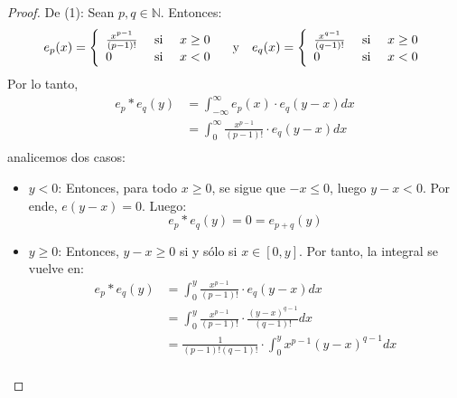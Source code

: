 \documentclass[12pt]{report}
\theoremstyle{largebreak}
\begin{document}
    \begin{proof}
        De (1): Sean $p,q\in\mathbb{N}$. Entonces:
        \begin{equation*}
            e_p(x)=\left\{
                    \begin{array}{lcr}
                        \frac{x^{p-1}}{(p-1)!} & \textup{ si } & x\geq 0 \\
                        0 & \textup{ si }&x<0\\
                    \end{array}
                \right.
            \quad\textup{y}\quad
            e_q(x)=\left\{
                    \begin{array}{lcr}
                        \frac{x^{q-1}}{(q-1)!} & \textup{ si } & x\geq 0 \\
                        0 & \textup{ si }&x<0\\
                    \end{array}
                \right.
        \end{equation*}
        Por lo tanto,
        \begin{equation*}
            \begin{split}
                e_p*e_q(y)&=\int_{-\infty}^\infty e_p(x)\cdot e_q(y-x)dx\\
                &=\int_{0}^\infty\frac{x^{p-1}}{(p-1)!}\cdot e_q(y-x)dx\\ 
            \end{split}
        \end{equation*}
        analicemos dos casos:
        \begin{itemize}
            \item $y<0$: Entonces, para todo $x\geq 0$, se sigue que $-x\leq 0$, luego $y-x<0$. Por ende, $e(y-x)=0$. Luego:
            \begin{equation*}
                e_p*e_q(y)=0=e_{p+q}(y)
            \end{equation*}
            \item $y\geq 0$: Entonces, $y-x\geq 0$ si y sólo si $x\in[0,y]$. Por tanto, la integral se vuelve en:
            \begin{equation*}
                \begin{split}
                    e_p*e_q(y)&=\int_{0}^y\frac{x^{p-1}}{(p-1)!}\cdot e_q(y-x)dx\\
                    &=\int_{0}^y\frac{x^{p-1}}{(p-1)!}\cdot\frac{(y-x)^{q-1}}{(q-1)!}dx\\
                    &=\frac{1}{(p-1)!(q-1)!}\cdot\int_{0}^y x^{p-1}(y-x)^{q-1}dx\\

\end{split}
\end{equation*}
\end{itemize}
\end{proof}
\end{document}
